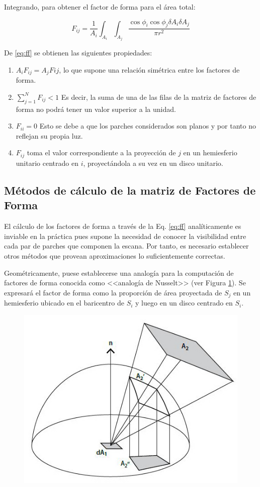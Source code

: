 Integrando, para obtener el factor de forma para el área total:

\begin{equation}
    F_{ij} = \frac{1}{A_{i}} \int_{A_{i}}\int_{A_{j}}\frac{\cos{\phi_{i}}\cos{\phi_{j}}\delta{A_{i}}\delta{A_{j}}}{\pi{r^{2}}} \label{eq:ff}    
\end{equation}

De \eqref{eq:ff} se obtienen las siguientes propiedades:
\begin{enumerate}
	\label{propsff}
    \item $A_{i}F_{ij} = A_{j}F{ij}$, lo que supone una relación simétrica entre los factores de forma.
    \item $\sum_{j=1}^{N} F_{ij} < 1$ Es decir, la suma de una de las filas de la matriz de factores de forma no podrá tener un valor superior a la unidad.
    \item $F_{ii} = 0$ Esto se debe a que los parches considerados son planos y por tanto no reflejan su propia luz.
    \item $F_{ij}$ toma el valor correspondiente a la proyección de $j$ en un hemiesferio unitario centrado en $i$, proyectándola a su vez en un disco unitario.
\end{enumerate}


\subsection{Métodos de cálculo de la matriz de Factores de Forma}
\label{sec:calculoff}

El cálculo de los factores de forma a través de la Eq. \eqref{eq:ff} analíticamente es inviable en la práctica pues supone la necesidad de conocer la visibilidad entre cada par de parches que componen la escana. Por tanto, es necesario establecer otros métodos que provean aproximaciones lo suficientemente correctas.

Geométricamente, puese establecerse una analogía para la computación de factores de forma conocida como <<analogía de Nusselt>> (ver Figura \ref{img:nusselt}). Se expresará el factor de forma como la proporción de área proyectada de $S_{j}$ en un hemiesferio ubicado en el baricentro de $S_{i}$ y luego en un disco centrado en $S_{i}$.

\begin{figure}[H]
	\centering
	\includegraphics[width=0.55\linewidth]{assets/nusselt}
	\label{img:nusselt}
\end{figure}

